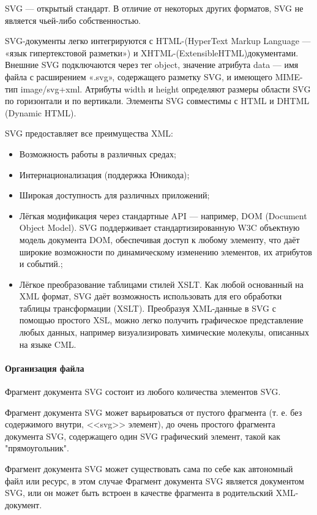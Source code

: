 SVG — открытый стандарт. В отличие от некоторых других форматов, SVG не является чьей-либо собственностью.

SVG-документы легко интегрируются с HTML-(HyperText Markup Language — «язык гипертекстовой разметки») и XHTML-(ExtensibleHTML)документами. Внешние SVG подключаются через тег object, значение атрибута data — имя файла с расширением «.svg», содержащего разметку SVG, и имеющего MIME-тип image/svg+xml. Атрибуты width и height определяют размеры области SVG по горизонтали и по вертикали. Элементы SVG совместимы с HTML и DHTML (Dynamic HTML).

SVG предоставляет все преимущества XML:
\begin{itemize}
	\item Возможность работы в различных средах;
	\item Интернационализация (поддержка Юникода);
	\item Широкая доступность для различных приложений;
	\item Лёгкая модификация через стандартные API — например, DOM (Document Object Model). SVG поддерживает стандартизированную W3C объектную модель документа DOM, обеспечивая доступ к любому элементу, что даёт широкие возможности по динамическому изменению элементов, их атрибутов и событий.;
	\item Лёгкое преобразование таблицами стилей XSLT. Как любой основанный на XML формат, SVG даёт возможность использовать для его обработки таблицы трансформации (XSLT). Преобразуя XML-данные в SVG с помощью простого XSL, можно легко получить графическое представление любых данных, например визуализировать химические молекулы, описанных на языке CML.
\end{itemize}

\paragraph{Организация файла}
\nopagebreak

Фрагмент документа SVG состоит из любого количества элементов SVG.

Фрагмент документа SVG может варьироваться от пустого фрагмента (т. е. без содержимого внутри, <<svg>> элемент), до очень простого фрагмента документа SVG, содержащего один SVG графический элемент, такой как "прямоугольник".

Фрагмент документа SVG может существовать сама по себе как автономный файл или ресурс, в этом случае Фрагмент документа SVG является документом SVG, или он может быть встроен в качестве фрагмента в родительский XML-документ.

